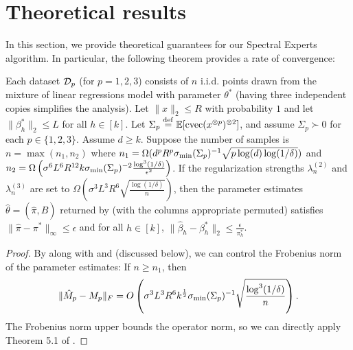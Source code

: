 \section{Theoretical results}

In this section, we provide theoretical guarantees for our Spectral Experts algorithm.
In particular, the following theorem provides a rate of convergence:

\begin{theorem}
  \label{thm:convergence}
Each dataset $\mathcal{D}_p$ (for $p = 1, 2, 3$) consists of $n$ i.i.d. points drawn from the mixture
of linear regressions model with parameter $\theta^*$
(having three independent copies simplifies the analysis).
Let $\|x\|_2 \le R$ with probability $1$
and let $\|\beta_h^*\|_2 \le L$ for all $h \in [k]$.
Let $\Sigma_p \stackrel{\rm def}{=} \operatorname{\mathbb{E}}[\operatorname{cvec}(x^{\otimes p})^{\otimes 2}]$, 
and assume $\Sigma_p \succ 0$ for each $p \in \{1,2,3\}$.
Assume $d \ge k$.
Suppose the number of samples is
$n = \max(n_1,n_2)$
where $n_1 = \Omega(d^p R^p \sigma_\text{\rm min}(\Sigma_p)^{-1} \sqrt{p \log(d) \log(1/\delta)})$ and
$n_2 = \Omega\left( \sigma^6 L^6 R^{12} k \sigma_\text{\rm min}(\Sigma_p)^{-2} \frac{\log^3 (1/\delta)}{\epsilon^2} \right)$.
If the regularization strengths $\lambda_n^{(2)}$ and $\lambda_n^{(3)}$ are
set to $\Omega(\sigma^3 L^3 R^6 \sqrt{\frac{\log(1/\delta)}{n}})$,
then the parameter estimates $\hat\theta = (\hat\pi, \hat B)$ returned by
 (with the columns appropriate permuted)
satisfies 
$\|\hat\pi - \pi^*\|_{\infty} \le \epsilon$
and for all $h \in [k]$,
$\|\hat\beta_h - \beta^*_h\|_2 \le \frac{\epsilon}{\pi_h^*}$.
\end{theorem}

\begin{proof}
By  along with  and  (discussed below),
we can control the Frobenius norm of the parameter estimates:
If $n \ge n_1$, then
\begin{align}
  \|\hat M_p - M_p\|_F = O\left( \sigma^3 L^3 R^6 k^{\frac12} \sigma_\text{\rm min}(\Sigma_p)^{-1} \sqrt{\frac{\log^3 (1/\delta)}{n}} \right).
\end{align}
The Frobenius norm upper bounds the operator norm,
so we can directly apply Theorem 5.1 of \cite{AnandkumarGeHsu2012}.
\end{proof}

